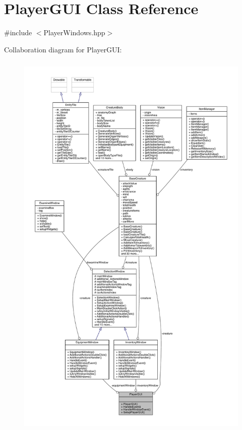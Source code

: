 \hypertarget{class_player_g_u_i}{}\section{Player\+G\+UI Class Reference}
\label{class_player_g_u_i}


{\ttfamily \#include $<$Player\+Windows.\+hpp$>$}



Collaboration diagram for Player\+G\+UI\+:
\nopagebreak
\begin{figure}[H]
\begin{center}
\leavevmode
\includegraphics[height=550pt]{d3/d9c/class_player_g_u_i__coll__graph}
\end{center}
\end{figure}
